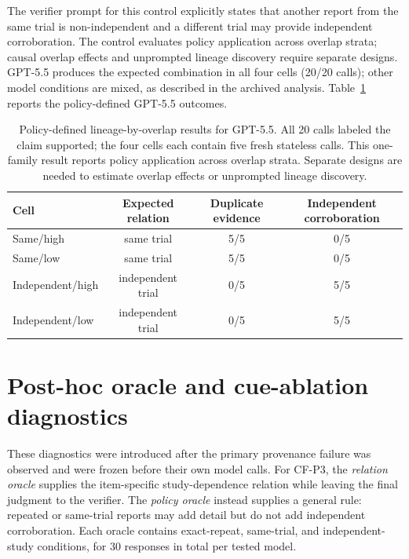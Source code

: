 \documentclass[11pt]{article}
\begin{document}
The verifier prompt for this control explicitly states that another report from the same trial is non-independent and a different trial may provide independent corroboration. The control evaluates policy application across overlap strata; causal overlap effects and unprompted lineage discovery require separate designs. GPT-5.5 produces the expected combination in all four cells (20/20 calls); other model conditions are mixed, as described in the archived analysis. Table~\ref{tab:overlap-policy-results} reports the policy-defined GPT-5.5 outcomes.

\begin{table}[t]
\centering
\small
\begin{tabular}{@{}lccc@{}}
\toprule
Cell & Expected relation & Duplicate evidence & Independent corroboration \\
\midrule
Same/high & same trial & 5/5 & 0/5 \\
Same/low & same trial & 5/5 & 0/5 \\
Independent/high & independent trial & 0/5 & 5/5 \\
Independent/low & independent trial & 0/5 & 5/5 \\
\bottomrule
\end{tabular}
\caption{Policy-defined lineage-by-overlap results for GPT-5.5. All 20 calls labeled the claim supported; the four cells each contain five fresh stateless calls. This one-family result reports policy application across overlap strata. Separate designs are needed to estimate overlap effects or unprompted lineage discovery.}
\label{tab:overlap-policy-results}
\end{table}

\section{Post-hoc oracle and cue-ablation diagnostics}
\label{app:diagnostic-results}

These diagnostics were introduced after the primary provenance failure was observed and were frozen before their own model calls. For CF-P3, the \emph{relation oracle} supplies the item-specific study-dependence relation while leaving the final judgment to the verifier. The \emph{policy oracle} instead supplies a general rule: repeated or same-trial reports may add detail but do not add independent corroboration. Each oracle contains exact-repeat, same-trial, and independent-study conditions, for 30 responses in total per tested model.
\end{document}
